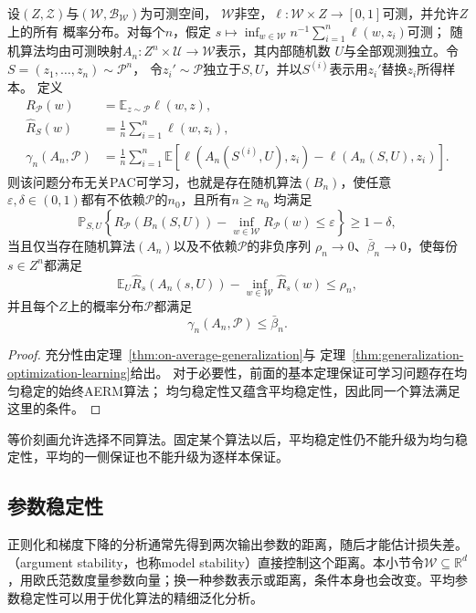 \begin{theorem}[一般学习基本定理的平均稳定性形式]
\label{thm:average-stability-characterization}
设$(Z,\mathcal Z)$与$(\mathcal W,\mathcal B_{\mathcal W})$为可测空间，
$\mathcal W$非空，$\ell:\mathcal W\times Z\to[0,1]$可测，并允许$Z$上的所有
概率分布。对每个$n$，假定
$s\mapsto\inf_{w\in\mathcal W}n^{-1}\sum_{i=1}^n\ell(w,z_i)$可测；
随机算法均由可测映射$A_n:Z^n\times\mathcal U\to\mathcal W$表示，其内部随机数
$U$与全部观测独立。令$S=(z_1,\ldots,z_n)\sim\mathcal P^n$，
令$z_i'\sim\mathcal P$独立于$S,U$，并以$S^{(i)}$表示用$z_i'$替换$z_i$所得样本。
定义
\[
\begin{aligned}
 R_{\mathcal P}(w)
 &=\mathbb E_{z\sim\mathcal P}\ell(w,z),\\
 \hat R_S(w)
 &=\frac1n\sum_{i=1}^n\ell(w,z_i),\\
 \gamma_n(A_n,\mathcal P)
 &=\frac1n\sum_{i=1}^n\mathbb E\!\left[
   \ell(A_n(S^{(i)},U),z_i)-\ell(A_n(S,U),z_i)\right].
\end{aligned}
\]
则该问题分布无关PAC可学习，也就是存在随机算法$(B_n)$，使任意
$\varepsilon,\delta\in(0,1)$都有不依赖$\mathcal P$的$n_0$，且所有$n\geq n_0$
均满足
\[
 \mathbb P_{S,U}\!\left\{
 R_{\mathcal P}(B_n(S,U))-\inf_{w\in\mathcal W}R_{\mathcal P}(w)
 \leq\varepsilon\right\}\geq1-\delta,
\]
当且仅当存在随机算法$(A_n)$以及不依赖$\mathcal P$的非负序列
$\rho_n\to0$、$\bar\beta_n\to0$，使每份$s\in Z^n$都满足
\[
 \mathbb E_U\hat R_s(A_n(s,U))
 -\inf_{w\in\mathcal W}\hat R_s(w)\leq\rho_n,
\]
并且每个$Z$上的概率分布$\mathcal P$都满足
\[
 \gamma_n(A_n,\mathcal P)\leq\bar\beta_n.
\]
\end{theorem}
\begin{proof}
充分性由定理~\ref{thm:on-average-generalization}与
定理~\ref{thm:generalization-optimization-learning}给出。
对于必要性，前面的基本定理保证可学习问题存在均匀稳定的始终AERM算法；
均匀稳定性又蕴含平均稳定性，因此同一个算法满足这里的条件。
\end{proof}

等价刻画允许选择不同算法。固定某个算法以后，平均稳定性仍不能升级为均匀稳定性，平均的一侧保证也不能升级为逐样本保证。

\subsection{参数稳定性}
\label{sec:parameter-stability}

正则化和梯度下降的分析通常先得到两次输出参数的距离，随后才能估计损失差。（argument stability，也称model stability）直接控制这个距离。本小节令$\mathcal W\subseteq\mathbb R^d$，用欧氏范数度量参数向量；换一种参数表示或距离，条件本身也会改变。平均参数稳定性可以用于优化算法的精细泛化分析。

